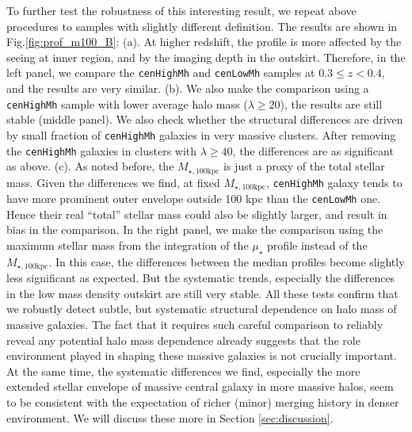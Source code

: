 \documentclass{emulateapj}
\def\rbcg{\texttt{cenHighMh}}
\def\nbcg{\texttt{cenLowMh}}
\def\mtot{{$M_{\star,100\mathrm{kpc}}$}}
\def\mden{{$\mu_{\star}$}}
\begin{document}
\begin{CJK*}{UTF8}{gbsn}
    To further test the robustness of this interesting result, we repeat above 
    procedures to samples with slightly different definition.  
    The results are shown in Fig.\ref{fig:prof_m100_B}: 
    (a). At higher redshift, the profile is more affected by the seeing at inner 
    region, and by the imaging depth in the outskirt.  
    Therefore, in the left panel, we compare the \rbcg{} and \nbcg{} samples at 
    $0.3 \leq z < 0.4$, and the results are very similar.
    (b). We also make the comparison using a \rbcg{} sample with lower average 
    halo mass ($\lambda \geq 20$), the results are still stable (middle panel). 
    We also check whether the structural differences are driven by small fraction 
    of \rbcg{} galaxies in very massive clusters.  
    After removing the \rbcg{} galaxies in clusters with $\lambda \geq 40$, the 
    differences are as significant as above.  
    (c). As noted before, the \mtot{} is just a proxy of the total stellar mass. 
    Given the differences we find, at fixed \mtot{}, \rbcg{} galaxy tends to have 
    more prominent outer envelope outside 100 kpc than the \nbcg{} one. 
    Hence their real ``total'' stellar mass could also be slightly larger, and 
    result in bias in the comparison.  
    In the right panel, we make the comparison using the maximum stellar mass from 
    the integration of the \mden{} profile instead of the \mtot{}.
    In this case, the differences between the median profiles become slightly 
    less significant as expected.  
    But the systematic trends, especially the differences in the low mass density 
    outskirt are still very stable.  
    All these tests confirm that we robustly detect subtle, but systematic 
    structural dependence on halo mass of massive galaxies.   
    The fact that it requires such careful comparison to reliably reveal any 
    potential halo mass dependence already suggests that the role environment
    played in shaping these massive galaxies is not crucially important.  
    At the same time, the systematic differences we find, especially the more 
    extended stellar envelope of massive central galaxy in more massive halos, 
    seem to be consistent with the expectation of richer (minor) merging history
    in denser environment. 
    We will discuss these more in Section \ref{sec:discussion}.


\end{CJK*}
\end{document}
